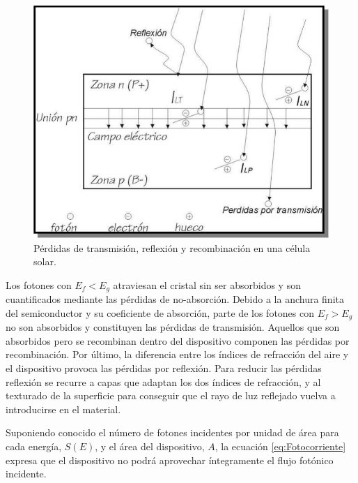 %
\begin{figure}
\begin{centering}
\includegraphics[scale=0.75]{../figs/CelulaSolar2}
\end{centering}

\caption{Pérdidas de transmisión, reflexión y recombinación en una célula solar.\label{fig:EsquemaPerdidasCelula}}

\end{figure}



Los fotones con $E_{f}<E_{g}$ atraviesan el cristal sin ser absorbidos
y son cuantificados mediante las pérdidas de no-absorción. Debido
a la anchura finita del semiconductor y su coeficiente de absorción,
parte de los fotones con $E_{f}>E_{g}$ no son absorbidos y constituyen
las pérdidas de transmisión. Aquellos que son absorbidos pero se recombinan
dentro del dispositivo componen las pérdidas por recombinación. Por
último, la diferencia entre los índices de refracción del aire y el
dispositivo provoca las pérdidas por reflexión. Para reducir las pérdidas
reflexión se recurre a capas que adaptan los dos índices de refracción,
y al texturado de la superficie para conseguir que el rayo de luz
reflejado vuelva a introducirse en el material.

Suponiendo conocido el número de fotones incidentes por unidad de
área para cada energía, $S(E)$, y el área del dispositivo, $A$,
la ecuación \ref{eq:Fotocorriente} expresa que el dispositivo no
podrá aprovechar íntegramente el flujo fotónico incidente.


